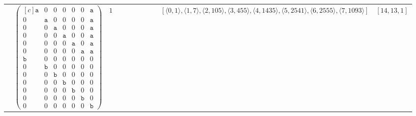 \documentclass[12pt]{article}
\theoremstyle{definition}
\theoremstyle{plain}
\begin{document}
{\begin{longtable}{@{}cYcccccccZc@{}}
& $\begin{pmatrix*}[c]
\mathtt{a}   &  0    &  0    &   0  &  0  &  0  &  \mathtt{a}  \\
0   &  \mathtt{a}    &  0    &   0  &  0  &  0  &  \mathtt{a}  \\
0   &  0    &  \mathtt{a}    &   0  &  0  &  0  &  \mathtt{a}  \\
0   &  0    &  0    &   \mathtt{a}  &  0  &  0  &  \mathtt{a}  \\
0   &  0    &  0    &   0  &  \mathtt{a}  &  0  &  \mathtt{a}  \\
0   &  0    &  0    &   0  &  0  &  \mathtt{a}  &  \mathtt{a}  \\
\mathtt{b}   &  0    &  0    &   0  &  0  &  0  &  0  \\
0   &  \mathtt{b}    &  0    &   0  &  0  &  0  &  0  \\
0   &  0    &  \mathtt{b}    &   0  &  0  &  0  &  0  \\
0   &  0    &  0    &   \mathtt{b}  &  0  &  0  &  0  \\
0   &  0    &  0    &   0  &  \mathtt{b}  &  0  &  0  \\
0   &  0    &  0    &   0  &  0  &  \mathtt{b}  &  0  \\
0   &  0    &  0    &   0  &  0  &  0  &  \mathtt{b}
\end{pmatrix*}$
& $1$
&
&
&
&
&
&
& $[\langle0,1\rangle,\allowbreak\langle1,7\rangle,\allowbreak\langle2,105\rangle,\allowbreak\langle3,455\rangle,\allowbreak\langle4,1435\rangle,\allowbreak\langle5,2541\rangle,\allowbreak\langle6,2555\rangle,\allowbreak\langle7,1093\rangle]$
& $[14,13,1]$     \\


\cmidrule(lr){2-11}


\end{longtable}}
\end{document}
